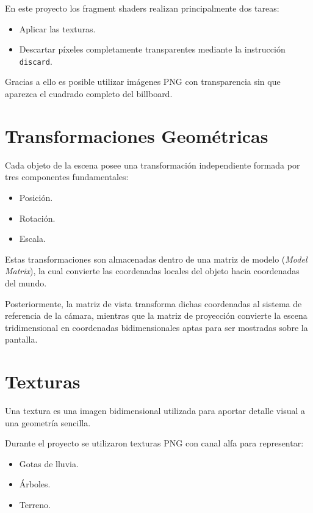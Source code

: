 En este proyecto los fragment shaders realizan principalmente dos tareas:

\begin{itemize}
\item Aplicar las texturas.
\item Descartar píxeles completamente transparentes mediante la instrucción \texttt{discard}.
\end{itemize}

Gracias a ello es posible utilizar imágenes PNG con transparencia sin que aparezca el cuadrado completo del billboard.

\section{Transformaciones Geométricas}

Cada objeto de la escena posee una transformación independiente formada por tres componentes fundamentales:

\begin{itemize}
\item Posición.
\item Rotación.
\item Escala.
\end{itemize}

Estas transformaciones son almacenadas dentro de una matriz de modelo (\textit{Model Matrix}), la cual convierte las coordenadas locales del objeto hacia coordenadas del mundo.

Posteriormente, la matriz de vista transforma dichas coordenadas al sistema de referencia de la cámara, mientras que la matriz de proyección convierte la escena tridimensional en coordenadas bidimensionales aptas para ser mostradas sobre la pantalla.

\section{Texturas}

Una textura es una imagen bidimensional utilizada para aportar detalle visual a una geometría sencilla.

Durante el proyecto se utilizaron texturas PNG con canal alfa para representar:

\begin{itemize}
\item Gotas de lluvia.
\item Árboles.
\item Terreno.
\end{itemize}

